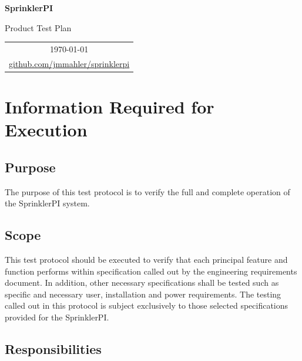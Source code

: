 \documentclass{article}
\begin{document}
\vspace*{1.0in}

\centerline{\LARGE \textbf{SprinklerPI}}
\vspace{0.3in}
\centerline{\LARGE Product Test Plan}

\vfill

\begin{center}
\begin{tabular}{c}
\today \\
\href{http://github.com/jmmahler/sprinklerpi}{github.com/jmmahler/sprinklerpi}
\end{tabular}
\end{center}

\vspace{2in}

\thispagestyle{empty}

\pagebreak

\thispagestyle{empty}
\tableofcontents
\clearpage

\section{Information Required for Execution}

\subsection{Purpose}

The purpose of this test protocol is to verify the full and complete
operation of the SprinklerPI system.

\subsection{Scope}

This test protocol should be executed to verify that each principal feature
and function performs within specification called out by the engineering
requirements document. In addition, other necessary specifications shall
be tested such as specific and necessary user, installation and power
requirements. The testing called out in this protocol is subject exclusively
to those selected specifications provided for the SprinklerPI.

\subsection{Responsibilities}
\end{document}
